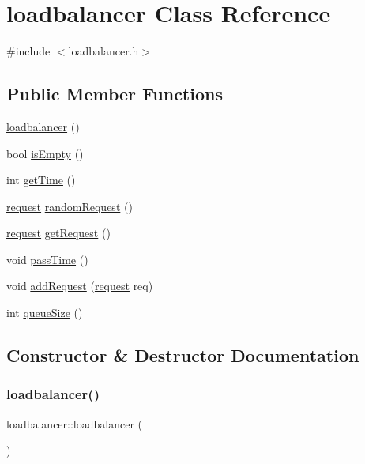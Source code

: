 \hypertarget{classloadbalancer}{}\section{loadbalancer Class Reference}
\label{classloadbalancer}


{\ttfamily \#include $<$loadbalancer.\+h$>$}

\subsection*{Public Member Functions}
\begin{DoxyCompactItemize}
\item 
\hyperlink{classloadbalancer_ad453fd2fc0c910f82ef31c18353fc774}{loadbalancer} ()
\item 
bool \hyperlink{classloadbalancer_a542b0b5b5759c074e3e8d1cbf1f33b52}{is\+Empty} ()
\item 
int \hyperlink{classloadbalancer_afc308893c7ab0fc8b92036deae7a2de9}{get\+Time} ()
\item 
\hyperlink{structrequest}{request} \hyperlink{classloadbalancer_abaa9c95170cbf3c1c3041b17d31df4c0}{random\+Request} ()
\item 
\hyperlink{structrequest}{request} \hyperlink{classloadbalancer_a3d1715e4b2218a7aa9ad74e3e4fa6167}{get\+Request} ()
\item 
void \hyperlink{classloadbalancer_a4d793bdf97c72b577ada58a774c3bddb}{pass\+Time} ()
\item 
void \hyperlink{classloadbalancer_a2c45d009dffc50f5d5d3a6c2b295311d}{add\+Request} (\hyperlink{structrequest}{request} req)
\item 
int \hyperlink{classloadbalancer_a9716bb001708f3c7792df0d1c8689ab0}{queue\+Size} ()
\end{DoxyCompactItemize}


\subsection{Constructor \& Destructor Documentation}
\mbox{\label{classloadbalancer_ad453fd2fc0c910f82ef31c18353fc774}} 
\subsubsection{\texorpdfstring{loadbalancer()}{loadbalancer()}}
{\footnotesize\ttfamily loadbalancer\+::loadbalancer (\begin{DoxyParamCaption}{ }\end{DoxyParamCaption})}

